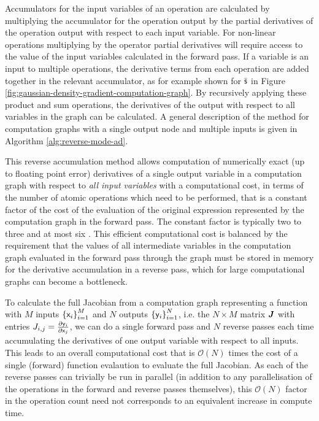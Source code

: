 Accumulators for the input variables of an operation are calculated by multiplying the accumulator for the operation output by the partial derivatives of the operation output with respect to each input variable. For non-linear operations multiplying by the operator partial derivatives will require access to the value of the input variables calculated in the forward pass. If a variable is an input to multiple operations, the derivative terms from each operation are added together in the relevant accumulator, as for example shown for $\bar{\mathsf{s}}$ in Figure \ref{fig:gaussian-density-gradient-computation-graph}. By recursively applying these product and sum operations, the derivatives of the output with respect to all variables in the graph can be calculated. A general description of the method for computation graphs with a single output node and multiple inputs is given in Algorithm \ref{alg:reverse-mode-ad}.

This reverse accumulation method allows computation of numerically exact (up to floating point error) derivatives of a single output variable in a computation graph with respect to \emph{all input variables} with a computational cost, in terms of the number of atomic operations which need to be performed, that is a constant factor of the cost of the evaluation of the original expression represented by the computation graph in the forward pass. The constant factor is typically two to three and at most six \citep{baydin2015automatic}. This efficient computational cost is balanced by the requirement that the values of all intermediate variables in the computation graph evaluated in the forward pass through the graph must be stored in memory for the derivative accumulation in a reverse pass, which for large computational graphs can become a bottleneck.

To calculate the full Jacobian from a computation graph representing a function with $M$ inputs $\fset{\rvar{x}_i}_{i=1}^M$ and $N$ outputs $\fset{\rvar{y}_i}_{i=1}^N$, i.e. the $N \times M$ matrix $\boldsymbol{J}$ with entries $J_{i,j} = \frac{\partial \mathsf{y}_i}{\partial \mathsf{x}_j}$, we can do a single forward pass and $N$ reverse passes each time accumulating the derivatives of one output variable with respect to all inputs. This leads to an overall computational cost that is $\mathcal{O}(N)$ times the cost of a single (forward) function evalaution to evaluate the full Jacobian. As each of the reverse passes can trivially be run in parallel (in addition to any parallelisation of the operations in the forward and reverse passes themselves), this $\mathcal{O}(N)$ factor in the operation count need not corresponds to an equivalent increase in compute time.

